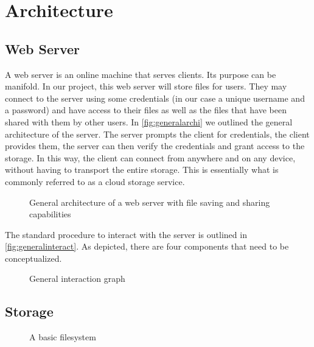 \section{Architecture}
\subsection{Web Server}

\begin{minipage}{0.44\textwidth}
    A web server is an online machine that serves clients. Its purpose can be manifold. In our project, this web server will store files for users. They may connect to the server using some credentials (in our case a unique username and a password) and have access to their files as well as the files that have been shared with them by other users. In \autoref{fig:generalarchi} we outlined the general architecture of the server. The server prompts the client for credentials, the client provides them, the server can then verify the credentials and grant access to the storage. In this way, the client can connect from anywhere and on any device, without having to transport the entire storage. This is essentially what is commonly referred to as a cloud storage service.
\end{minipage}
\begin{minipage}{0.47\textwidth}
    \begin{figure}[H]
        
        \caption{\label{fig:generalarchi} General architecture of a web server with file saving and sharing capabilities }
    \end{figure}
\end{minipage}


The standard procedure to interact with the server is outlined in \autoref{fig:generalinteract}. As depicted, there are four components that need to be conceptualized.

\begin{minipage}{1\textwidth}
    \begin{figure}[H]
        \centering
        
        \caption{\label{fig:generalinteract} General interaction graph }
    \end{figure}
\end{minipage}

\subsection{Storage}

\begin{minipage}{1\textwidth}
    \begin{figure}[H]
        \centering
        
        \caption{\label{fig:filesystem} A basic filesystem }
    \end{figure}
\end{minipage}